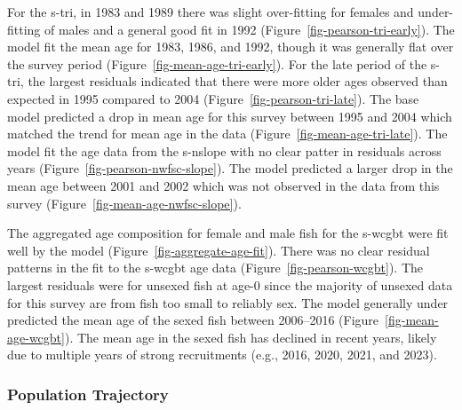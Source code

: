 \documentclass[
  english,
]{article}
\begin{document}
For the \gls{s-tri}, in 1983 and 1989 there was slight over-fitting for
females and under-fitting of males and a general good fit in 1992
(Figure~\ref{fig-pearson-tri-early}). The model fit the mean age for
1983, 1986, and 1992, though it was generally flat over the survey
period (Figure~\ref{fig-mean-age-tri-early}). For the late period of the
\gls{s-tri}, the largest residuals indicated that there were more older
ages observed than expected in 1995 compared to 2004
(Figure~\ref{fig-pearson-tri-late}). The base model predicted a drop in
mean age for this survey between 1995 and 2004 which matched the trend
for mean age in the data (Figure~\ref{fig-mean-age-tri-late}). The model
fit the age data from the \gls{s-nslope} with no clear patter in
residuals across years (Figure~\ref{fig-pearson-nwfsc-slope}). The model
predicted a larger drop in the mean age between 2001 and 2002 which was
not observed in the data from this survey
(Figure~\ref{fig-mean-age-nwfsc-slope}).

The aggregated age composition for female and male fish for the
\gls{s-wcgbt} were fit well by the model
(Figure~\ref{fig-aggregate-age-fit}). There was no clear residual
patterns in the fit to the \gls{s-wcgbt} age data
(Figure~\ref{fig-pearson-wcgbt}). The largest residuals were for unsexed
fish at age-0 since the majority of unsexed data for this survey are
from fish too small to reliably sex. The model generally under predicted
the mean age of the sexed fish between 2006--2016
(Figure~\ref{fig-mean-age-wcgbt}). The mean age in the sexed fish has
declined in recent years, likely due to multiple years of strong
recruitments (e.g., 2016, 2020, 2021, and 2023).

\subsubsection{Population Trajectory}\label{population-trajectory}
\end{document}

